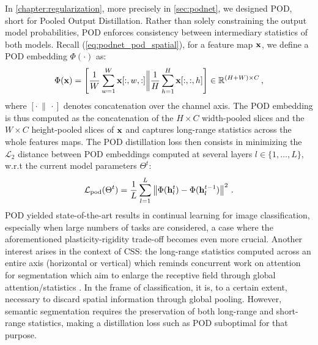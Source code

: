 In \autoref{chapter:regularization}, more precisely in \autoref{sec:podnet}, we designed POD, short
for Pooled Output Distillation. Rather than solely constraining the output model probabilities, POD
enforces consistency between intermediary statistics of both models. Recall
(\autoref{eq:podnet_pod_spatial}), for a feature map $\mathbf{x}$, we define a POD embedding $\Phi(\cdot)$
as:
%
\begin{equation}
    \Phi(\mathbf{x}) = \left[\frac{1}{W} \sum_{w=1}^W \mathbf{x}[:,w,:] \bigg\Vert \frac{1}{H} \sum_{h=1}^H \mathbf{x}[:,:,h]\right] \in \mathbb{R}^{(H + W) \times C}\,,
    \label{eq:seg_pod_embedding}
\end{equation}
%
where $[\cdot\,\|\,\cdot]$ denotes concatenation over the channel axis. The POD embedding is thus
computed as the concatenation of the $H \times C$ width-pooled slices and the $W \times C$
height-pooled slices of $\mathbf{x}$ and captures long-range statistics across the whole features maps. The
POD distillation loss then consists in minimizing the $\mathcal{L}_2$ distance between POD
embeddings computed at several layers $l \in \{1, \dots, L\}$, w.r.t the current model parameters
$\Theta^t$:
%
\begin{equation}
    \mathcal{L}_\text{pod}(\Theta^t) = \frac{1}{L} \sum_{l = 1}^L \left\Vert  \Phi(\mathbf{h}^t_l) -  \Phi(\mathbf{h}^{t-1}_l) \right\Vert^2\,.
    \label{eq:seg_pod_loss}
\end{equation}
%
POD yielded state-of-the-art results in continual learning for image classification, especially when
large numbers of tasks are considered, a case where the aforementioned plasticity-rigidity trade-off
becomes even more crucial. Another interest arises in the context of \ac{CSS}: the long-range
statistics computed across an entire axis (horizontal or vertical) which reminds concurrent work on
attention for segmentation \citep{wang2020axialdeeplab,huang2020ccnet,park2020csc} which aim to
enlarge the receptive field through global attention/statistics \citep{wang2020axialdeeplab}. In the
frame of classification, it is, to a certain extent, necessary to discard spatial information
through global pooling. However, semantic segmentation requires the preservation of both long-range
and short-range statistics, making a distillation loss such as POD suboptimal for that purpose.


